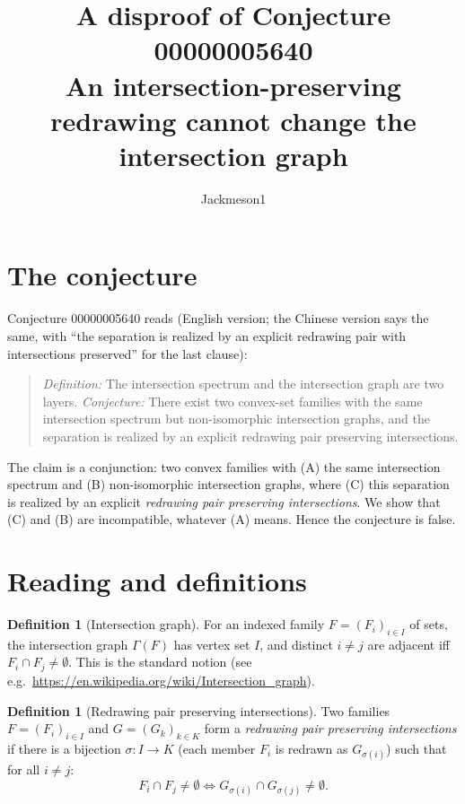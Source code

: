\documentclass[11pt]{article}
\title{A disproof of Conjecture 00000005640\\[2pt]
\large An intersection-preserving redrawing cannot change the intersection graph}
\author{Jackmeson1}
\date{}
\theoremstyle{definition}
\newtheorem{definition}[theorem]{Definition}
\theoremstyle{remark}
\renewcommand{\_}{\oldus\allowbreak}
\begin{document}
\sloppy
\maketitle

\section{The conjecture}

Conjecture 00000005640 reads (English version; the Chinese version says the same, with
``the separation is realized by an explicit redrawing pair with intersections preserved'' for the
last clause):

\begin{quote}
\emph{Definition:} The intersection spectrum and the intersection graph are two layers.
\emph{Conjecture:} There exist two convex-set families with the same intersection spectrum but
non-isomorphic intersection graphs, and the separation is realized by an explicit redrawing pair
preserving intersections.
\end{quote}

The claim is a conjunction: two convex families with (A) the same intersection spectrum and (B)
non-isomorphic intersection graphs, where (C) this separation is realized by an explicit
\emph{redrawing pair preserving intersections}. We show that (C) and (B) are incompatible, whatever
(A) means. Hence the conjecture is false.

\section{Reading and definitions}

\begin{definition}[Intersection graph]
For an indexed family $F=(F_i)_{i\in I}$ of sets, the intersection graph $\Gamma(F)$ has vertex set
$I$, and distinct $i\neq j$ are adjacent iff $F_i\cap F_j\neq\emptyset$. This is the standard
notion (see e.g.\ \url{https://en.wikipedia.org/wiki/Intersection_graph}).
\end{definition}

\begin{definition}[Redrawing pair preserving intersections]
Two families $F=(F_i)_{i\in I}$ and $G=(G_k)_{k\in K}$ form a \emph{redrawing pair preserving
intersections} if there is a bijection $\sigma\colon I\to K$ (each member $F_i$ is redrawn as
$G_{\sigma(i)}$) such that for all $i\neq j$:
\[ F_i\cap F_j\neq\emptyset \iff G_{\sigma(i)}\cap G_{\sigma(j)}\neq\emptyset. \]
\end{definition}
\end{document}
